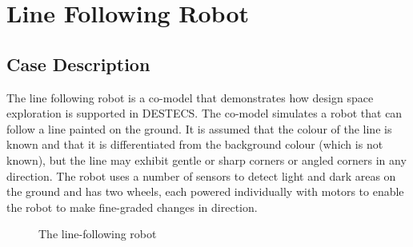 \chapter{Line Following Robot} \label{chap:lineFollowingRobot}
\section{Case Description} The line following robot is a
co-model that demonstrates how design space exploration is supported
in DESTECS.  The co-model simulates a robot that can follow a line
painted on the ground. It is assumed that the colour of the line is
known and that it is differentiated from the background colour (which
is not known), but the line may exhibit gentle or sharp corners or
angled corners in any direction. The robot uses a number of sensors to
detect light and dark areas on the ground and has two wheels, each
powered individually with motors to enable the robot to make
fine-graded changes in direction.

\begin{figure}[htb!]
\begin{center}
\caption{The line-following robot}
\label{fig:r2g2p_study}
\end{center}
\end{figure}

